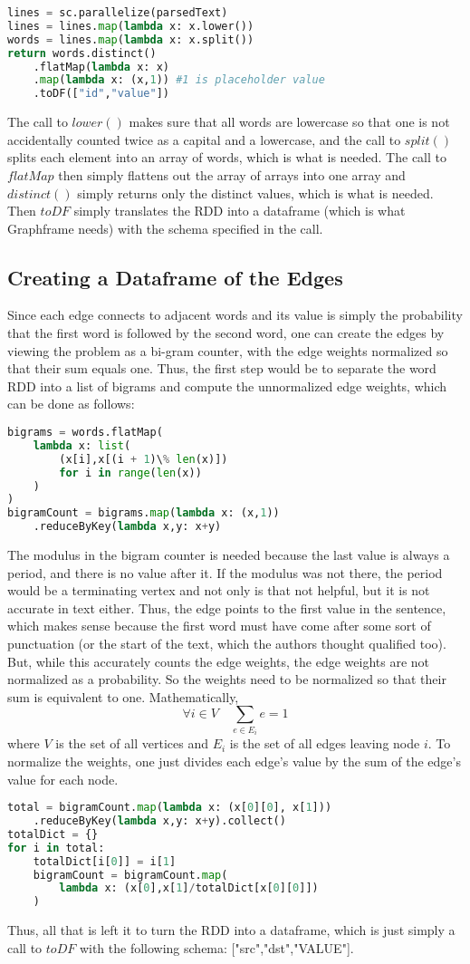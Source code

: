 \documentclass[9pt,twocolumn,twoside]{idsi}
\begin{document}
\begin{lstlisting}[language=python]
lines = sc.parallelize(parsedText)
lines = lines.map(lambda x: x.lower())
words = lines.map(lambda x: x.split())
return words.distinct()
    .flatMap(lambda x: x)
    .map(lambda x: (x,1)) #1 is placeholder value
    .toDF(["id","value"])
\end{lstlisting}

The call to $lower()$ makes sure that all words are lowercase so that one is not accidentally counted twice as a capital and a lowercase, and the call to $split()$ splits each element into an array of words, which is what is needed. The call to $flatMap$ then simply flattens out the array of arrays into one array and $distinct()$ simply returns only the distinct values, which is what is needed. Then $toDF$ simply translates the RDD into a dataframe (which is what Graphframe needs) with the schema specified in the call.
\subsection{Creating a Dataframe of the Edges}
Since each edge connects to adjacent words and its value is simply the probability that the first word is followed by the second word, one can create the edges by viewing the problem as a bi-gram counter, with the edge weights normalized so that their sum equals one. 
Thus, the first step would be to separate the word RDD into a list of bigrams and compute the unnormalized edge weights, which can be done as follows:
\begin{lstlisting}[language=python]
bigrams = words.flatMap(
    lambda x: list(
        (x[i],x[(i + 1)\% len(x)])
        for i in range(len(x))
    )
)
bigramCount = bigrams.map(lambda x: (x,1))
    .reduceByKey(lambda x,y: x+y)
\end{lstlisting}
The modulus in the bigram counter is needed because the last value is always a period, and there is no value after it. If the modulus was not there, the period would be a terminating vertex and not only is that not helpful, but it is not accurate in text either. Thus, the edge points to the first value in the sentence, which makes sense because the first word must have come after some sort of punctuation (or the start of the text, which the authors thought qualified too).
But, while this accurately counts the edge weights, the edge weights are not normalized as a probability. So the weights need to be normalized so that their sum is equivalent to one. Mathematically,
\[ \forall i \in V \quad \sum_{e \in E_i}e = 1 \]
where $V$ is the set of all vertices and $E_i$ is the set of all edges leaving node $i$.
To normalize the weights, one just divides each edge's value by the sum of the edge's value for each node. 
\begin{lstlisting}[language=python]
total = bigramCount.map(lambda x: (x[0][0], x[1]))
    .reduceByKey(lambda x,y: x+y).collect()
totalDict = {}
for i in total:
    totalDict[i[0]] = i[1]
    bigramCount = bigramCount.map(
        lambda x: (x[0],x[1]/totalDict[x[0][0]])
    )
\end{lstlisting}
Thus, all that is left it to turn the RDD into a dataframe, which is just simply a call to $toDF$ with the following schema: ["src","dst","VALUE"].
\end{document}
